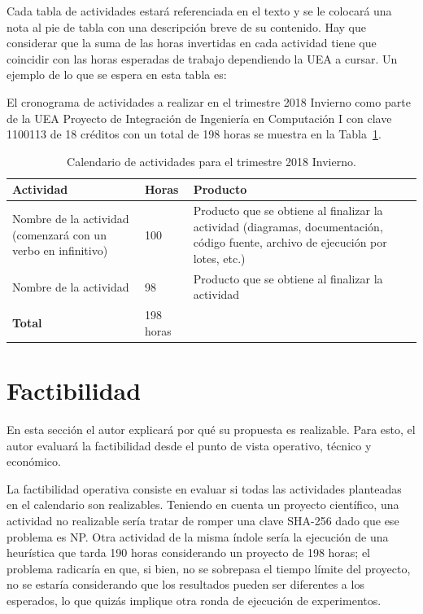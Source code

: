 Cada tabla de actividades estará referenciada en el texto y se le colocará una nota al pie de tabla con una descripción breve de su contenido. Hay que considerar que la suma de las horas invertidas en cada actividad tiene que coincidir con las horas esperadas de trabajo dependiendo la UEA a cursar. Un ejemplo de lo que se espera en esta tabla es:

El cronograma de actividades a realizar en el trimestre 2018 Invierno como parte de la UEA Proyecto de Integración de Ingeniería en Computación I con clave 1100113 de 18 créditos con un total de 198 horas se muestra en la Tabla~\ref{table:calendar}.

\begin{table}[h!]
  \begin{tabular}{p{} p{} p{}}
    \toprule
    \textbf{{Actividad}} & \textbf{{Horas}} & \textbf{{Producto}} \\
    \toprule
    Nombre de la actividad (comenzará con un verbo en infinitivo) &
    100 &
    Producto que se obtiene al finalizar la actividad (diagramas, documentación, código fuente, archivo de ejecución por lotes, etc.)\\
    \midrule
    Nombre de la actividad &
    98 &
    Producto que se obtiene al finalizar la actividad\\
    \midrule
    \textbf{Total} & 198 horas & \\
    \bottomrule
  \end{tabular}
  \caption{Calendario de actividades para el trimestre 2018 Invierno.}
  \label{table:calendar}
\end{table}

\section*{Factibilidad}

En esta sección el autor explicará por qué su propuesta es realizable. Para esto, el autor evaluará la factibilidad desde el punto de vista operativo, técnico y económico.

La factibilidad operativa consiste en evaluar si todas las actividades planteadas en el calendario son realizables. Teniendo en cuenta un proyecto científico, una actividad no realizable sería tratar de romper una clave SHA-256 dado que ese problema es NP. Otra actividad de la misma índole sería la ejecución de una heurística que tarda 190 horas considerando un proyecto de 198 horas; el problema radicaría en que, si bien, no se sobrepasa el tiempo límite del proyecto, no se estaría considerando que los resultados pueden ser diferentes a los esperados, lo que quizás implique otra ronda de ejecución de experimentos.

